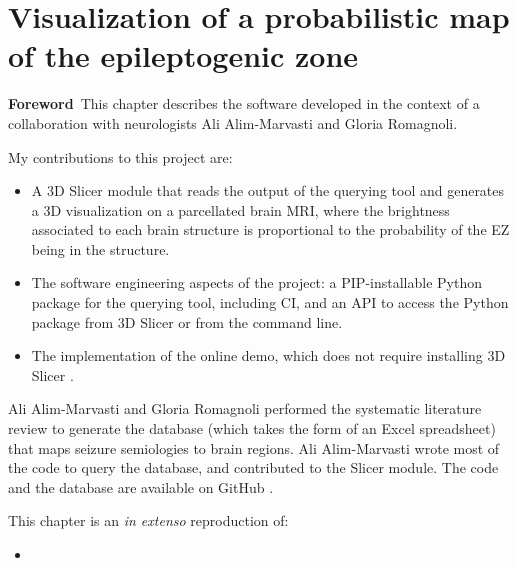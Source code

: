 \chapter[Visualization of a probabilistic map of the epileptogenic zone]{Visualization of a probabilistic map of the epileptogenic zone}

\label{chap:svt}

\minitoc

\acresetall
\begin{center}
  \begin{minipage}[b]{0.9\linewidth}
    \small
    \textbf{Foreword\,}
    This chapter describes the software developed in the context of a collaboration with neurologists Ali Alim-Marvasti and Gloria Romagnoli.

    My contributions to this project are:
    \begin{itemize}
      \item A 3D Slicer module \cite{fedorov_3d_2012} that reads the output of the querying tool and generates a 3D visualization on a parcellated brain \ac{MRI}, where the brightness associated to each brain structure is proportional to the probability of the \ac{EZ} being in the structure.
      \item The software engineering aspects of the project: a \acs{PIP}-installable Python package for the querying tool, including \ac{CI}, and an \ac{API} to access the Python package from 3D Slicer or from the command line.
      \item The implementation of the online demo, which does not require installing 3D Slicer%
      .
    \end{itemize}
  \end{minipage}

  \begin{minipage}[b]{0.9\linewidth}
    \small
    Ali Alim-Marvasti and Gloria Romagnoli performed the systematic literature review to generate the database (which takes the form of an Excel spreadsheet) that maps seizure semiologies to brain regions.
    Ali Alim-Marvasti wrote most of the code to query the database, and contributed to the Slicer module.
    The code and the database are available on GitHub%
    \fnurl{\svtgithub}.

    This chapter is an \textit{in extenso} reproduction of:
    \begin{itemize}
      \item {}
    \end{itemize}


\end{minipage}
\end{center}
